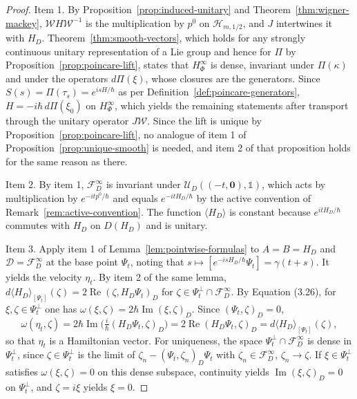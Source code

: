 \begin{proof}
	Item 1. By Proposition~\ref{prop:induced-unitary} and Theorem~\ref{thm:wigner-mackey}, $\mathcal{W}H\mathcal{W}^{-1}$ is the multiplication by $p^0$ on $\mathcal{H}_{m,1/2}$, and $J$ intertwines it with $H_D$. Theorem~\ref{thm:smooth-vectors}, which holds for any strongly continuous unitary representation of a Lie group and hence for $\Pi$ by Proposition~\ref{prop:poincare-lift}, states that $H^\infty_\Phi$ is dense, invariant under $\Pi(\kappa)$ and under the operators $d\Pi(\xi)$, whose closures are the generators. Since $S(s)=\Pi(\tau_s)=e^{isH/\hbar}$ as per Definition~\ref{def:poincare-generators}, $H=-i\hbar\,d\Pi(\xi_0)$ on $H^\infty_\Phi$, which yields the remaining statements after transport through the unitary operator $J\mathcal{W}$. Since the lift is unique by Proposition~\ref{prop:poincare-lift}, no analogue of item 1 of Proposition~\ref{prop:unique-smooth} is needed, and item 2 of that proposition holds for the same reason as there.
	
	Item 2. By item 1, $\mathcal{F}_D^\infty$ is invariant under $\mathcal{U}_D((-t,\mathbf{0}),\mathbb{1})$, which acts by multiplication by $e^{-itp^0/\hbar}$ and equals $e^{-itH_D/\hbar}$ by the active convention of Remark~\ref{rem:active-convention}. The function $\langle H_D\rangle$ is constant because $e^{itH_D/\hbar}$ commutes with $H_D$ on $D(H_D)$ and is unitary.
	
	Item 3. Apply item 1 of Lemma~\ref{lem:pointwise-formulas} to $A=B=H_D$ and $\mathcal{D}=\mathcal{F}_D^\infty$ at the base point $\Psi_t$, noting that $s\mapsto[e^{-isH_D/\hbar}\Psi_t]=\gamma(t+s)$. It yields the velocity $\eta_t$. By item 2 of the same lemma, $d\langle H_D\rangle_{[\Psi_t]}(\zeta)=2\operatorname{Re}(\zeta,H_D\Psi_t)_D$ for $\zeta\in\Psi_t^\perp\cap\mathcal{F}_D^\infty$. By Equation (3.26), for $\xi,\zeta\in\Psi_t^\perp$ one has $\omega(\xi,\zeta)=2\hbar\operatorname{Im}(\xi,\zeta)_D$. Since $(\Psi_t,\zeta)_D=0$,
	\begin{equation*}
		\omega(\eta_t,\zeta)=2\hbar\operatorname{Im}\Big(\tfrac{i}{\hbar}(H_D\Psi_t,\zeta)_D\Big)=2\operatorname{Re}(H_D\Psi_t,\zeta)_D=d\langle H_D\rangle_{[\Psi_t]}(\zeta),
	\end{equation*}
	so that $\eta_t$ is a Hamiltonian vector. For uniqueness, the space $\Psi_t^\perp\cap\mathcal{F}_D^\infty$ is dense in $\Psi_t^\perp$, since $\zeta\in\Psi_t^\perp$ is the limit of $\zeta_n-(\Psi_t,\zeta_n)_D\Psi_t$ with $\zeta_n\in\mathcal{F}_D^\infty$, $\zeta_n\to\zeta$. If $\xi\in\Psi_t^\perp$ satisfies $\omega(\xi,\zeta)=0$ on this dense subspace, continuity yields $\operatorname{Im}(\xi,\zeta)_D=0$ on $\Psi_t^\perp$, and $\zeta=i\xi$ yields $\xi=0$.
	

\end{proof}
